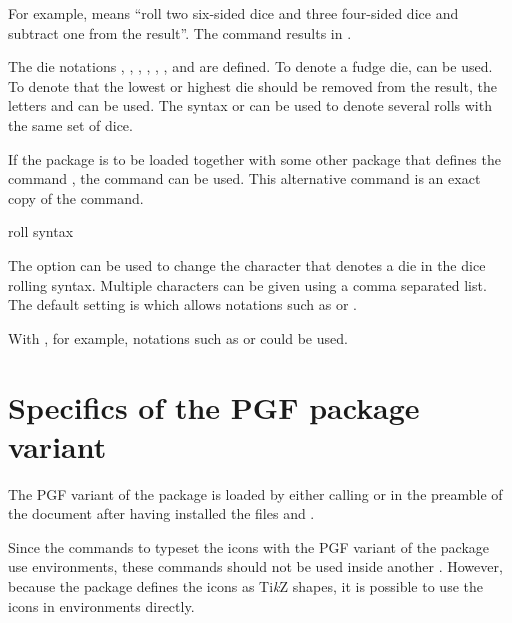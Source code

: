 \documentclass[a4paper]{article}
\begin{document}
For example,  means ``roll two six-sided dice and three four-sided dice and subtract one from the result''. The command  results in .

The die notations , , , , , ,  and  are defined. To denote a fudge die,  can be used. To denote that the lowest or highest die should be removed from the result, the letters  and  can be used. The syntax  or  can be used to denote several rolls with the same set of dice.

If the  package is to be loaded together with some other package that defines the command \macro{\roll}, the command \macro{\RPGIconsRoll} can be used. This alternative command is an exact copy of the \macro{\roll} command.

\begin{macrodef}
roll syntax
\end{macrodef}
The option  can be used to change the character that denotes a die in the dice rolling syntax. Multiple characters can be given using a comma separated list. The default setting is  which allows notations such as  or .

With , for example, notations such as  or  could be used.


\RenewCommandCopy\die\rpgiconsdie
\RenewCommandCopy\ability\rpgiconsability

\section{Specifics of the PGF package variant}

The PGF variant of the package is loaded by either calling \macro{\usepackage[pgf]{rpgicons}} or \macro{\usepackage{rpgicons-pgf}} in the preamble of the document after having installed the files  and .

Since the commands to typeset the icons with the PGF variant of the package use  environments, these commands should not be used inside another . However, because the package defines the icons as Ti\emph{k}Z shapes, it is possible to use the icons in  environments directly.
\end{document}

